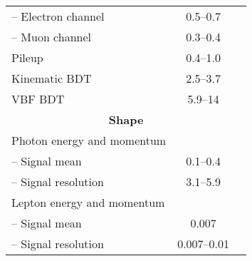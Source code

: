 \begin{table*}[!htb]
{\begin{tabular}{l@{\hskip 0.3in}c@{\hskip 0.3in}c}
  -- Electron channel                   			   	                     					&0.5--0.7  	 	 &            \\
  -- Muon channel                       				   	       					  			&0.3--0.4  	 &               \\
  Pileup                 				   			   & 0.4--1.0 & \checkmark{}             \\
  Kinematic BDT               & 2.5--3.7         				  &  \checkmark{}\\
  VBF BDT                            				 			   & 5.9--14 &  \checkmark{}\\
  \multicolumn{3}{c}{\textbf{Shape}}\\
  Photon energy and momentum					       && \checkmark{}             \\
  -- Signal mean                        						               					 & 0.1--0.4       &              \\
  -- Signal resolution                        						               		& 3.1--5.9       &              \\
  Lepton energy and momentum     				 			 				  	  &&   \checkmark{}       	                 \\
  -- Signal mean                        						       							 & 0.007  &        \\
  -- Signal resolution                  				  	     							   & 0.007--0.01 &               \\\hline
  \end{tabular}
  }
  \end{table*}
